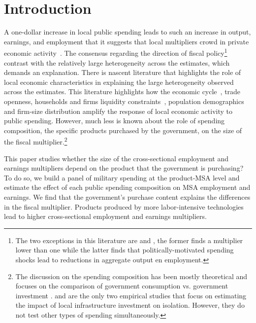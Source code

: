 \documentclass[dv_diss_main.tex]{subfiles}
\begin{document}
\section{Introduction}
\label{sec:into}

A one-dollar increase in local public spending leads to such an increase in output, earnings, and employment that it suggests that local multipliers crowd in private economic activity~\cite{chodorow2019geographic}. The consensus regarding the direction of fiscal policy\footnote{The two exceptions in this literature are \cite{Dupor2017} and \cite{cohen2011powerful}, the former finds a multiplier lower than one while the latter finds that politically-motivated spending shocks lead to reductions in aggregate output en employment.} contrast with the relatively large heterogeneity across the estimates, which demands an explanation. There is nascent literature that highlights the role of local economic characteristics in explaining the large heterogeneity observed across the estimates. This literature highlights how the economic cycle~\citep{cohen2011powerful, serrato2016estimating,buchheim2020job}, trade openness\citep{corbi2019regional}, households and firms liquidity constraints~\citep{Demyanyk2019,auerbach2020effects, bruckner2014local}, population demographics~\citep{basso2021young} and firm-size distribution \citep{Juarros2021} amplify the response of local economic activity to public spending. However, much less is known about the role of spending composition, the specific products purchased by the government, on the size of the fiscal multiplier.\footnote{The discussion on the spending composition has been mostly theoretical and focuses on the comparison of government consumption vs. government investment \citep{Boehm2020,ramey2020macroeconomic}. \cite{garin2019putting} and \cite{buchheim2017employment} are the only two empirical studies that focus on estimating the impact of local infrastructure investment on isolation. However, they do not test other types of spending simultaneously.} 



This paper studies whether the size of the cross-sectional employment and earnings multipliers depend on the product that the government is purchasing? To do so, we build a panel of military spending at the product-MSA level and estimate the effect of each public spending composition on MSA employment and earnings. We find that the government's purchase content explains the differences in the fiscal multiplier. Products produced by more labor-intensive technologies lead to higher cross-sectional employment and earnings multipliers. 
 
\end{document}
